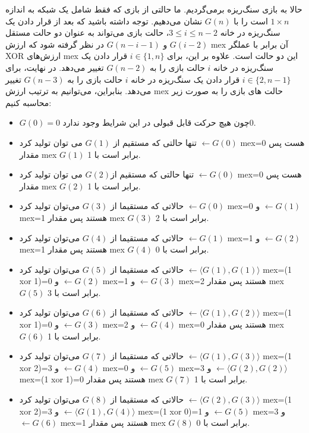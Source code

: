 \begin{solution}
حالا به بازی سنگ‌ریزه برمی‌گردیم. ما حالتی از بازی که فقط شامل یک شبکه به اندازه $1 \times n$ است را با $G(n)$ نشان می‌دهیم. توجه داشته باشید که بعد از قرار دادن یک سنگ‌ریزه در خانه $3 \leq i \leq n-2$، حالت بازی می‌تواند به عنوان دو حالت مستقل $G(i-2)$ و $G(n-i-1)$ در نظر گرفته شود که ارزش mex آن برابر با عملگر XOR ارزش‌های mex این دو حالت است. علاوه بر این، برای $i \in \{1,n\}$ قرار دادن یک سنگ‌ریزه در خانه $i$ حالت بازی را به $G(n-2)$ تغییر می‌دهد. در نهایت، برای $i \in \{2,n-1\}$ قرار دادن یک سنگ‌ریزه در خانه $i$ حالت بازی را به $G(n-3)$ تغییر می‌دهد. بنابراین، می‌توانیم به‌ ترتیب ارزش‌ mex حالت های بازی را به صورت زیر محاسبه کنیم:
	\begin{itemize}
		\item $G(0) = 0$ چون هیچ حرکت قابل قبولی در این شرایط وجود ندارد$0$.
		\item تنها حالتی که مستقیم از $G(1)$ می توان تولید کرد $\leftarrow G(0)$ mex=0 هست پس مقدار  mex  $G(1)$ برابر است با 1.
		\item تنها حالتی که مستقیم از$G(2)$ می توان تولید کرد $\leftarrow G(0)$ mex=0   هست پس مقدار mex $G(2)$ برابر است با 1.
		\item حالاتی که مستقیما از $G(3)$ می‌توان تولید کرد $\leftarrow G(0)$ mex=0 و $\leftarrow G(1)$ mex=1  هستند پس مقدار mex  $G(3)$ برابر است با 2.
		\item حالاتی که مستقیما از $G(4)$ می‌توان تولید کرد $\leftarrow G(1)$ mex=1 و $\leftarrow G(2)$ mex=1  هستند پس مقدار mex  $G(4)$ برابر است با 0.
		\item حالاتی که مستقیما از $G(5)$ می‌توان تولید کرد $\leftarrow \langle G(1), G(1) \rangle$ mex=(1 xor 1)=0 و $\leftarrow G(2)$ mex=1 و $\leftarrow G(3)$ mex=2  هستند پس مقدار mex  $G(5)$ برابر است با 3.
		\item حالاتی که مستقیما از $G(6)$ می‌توان تولید کرد $\leftarrow \langle G(1), G(2) \rangle$ mex=(1 xor 1)=0 و $\leftarrow G(3)$ mex=2 و $\leftarrow G(4)$ mex=0  هستند پس مقدار mex  $G(6)$ برابر است با 1.
		\item حالاتی که مستقیما از $G(7)$ می‌توان تولید کرد $\leftarrow \langle G(1), G(3) \rangle$ mex=(1 xor 2)=3 و $\leftarrow G(4)$ mex=0 و $\leftarrow G(5)$ mex=3 و $\leftarrow \langle G(2), G(2) \rangle$ mex=(1 xor 1)=0  هستند پس مقدار mex  $G(7)$ برابر است با 1.
		\item حالاتی که مستقیما از $G(8)$ می‌توان تولید کرد $\leftarrow \langle G(2), G(3) \rangle$ mex=(1 xor 2)=3 و $\leftarrow \langle G(1), G(4) \rangle$ mex=(1 xor 0)=1 و $\leftarrow G(5)$ mex=3 و $\leftarrow G(6)$ mex=1  هستند پس مقدار mex  $G(8)$ برابر است با 0.

\end{itemize}
\end{solution}
